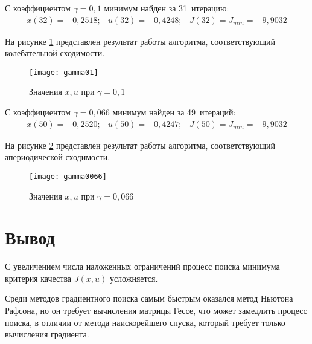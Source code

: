 \documentclass[14pt, a4paper]{extarticle}
\begin{document}
	С коэффициентом $\gamma=0,1$ минимум найден за 31~итерацию:
	$$\begin{matrix}
		x(32)=-0,2518; & u(32)=-0,4248; & J(32)=J_{min}=-9,9032
	\end{matrix}$$
	
	На рисунке \ref{fig:gamma01} представлен результат работы алгоритма, соответствующий колебательной сходимости.
	
	\begin{figure}[H]
		\centering
		\texttt{[image: gamma01]}
		\caption{Значения $x,u$ при $\gamma=0,1$}
		\label{fig:gamma01}
	\end{figure}
	
	С коэффициентом $\gamma=0,066$ минимум найден за 49~итераций:
	$$\begin{matrix}
		x(50)=-0,2520; & u(50)=-0,4247; & J(50)=J_{min}=-9,9032
	\end{matrix}$$

	На рисунке \ref{fig:gamma0066} представлен результат работы алгоритма, соответствующий апериодической сходимости.
	
	\begin{figure}[H]
		\centering
		\texttt{[image: gamma0066]}
		\caption{Значения $x,u$ при $\gamma=0,066$}
		\label{fig:gamma0066}
	\end{figure}

	\newpage
	
	\section*{Вывод}
	
	С увеличением числа наложенных ограничений процесс поиска минимума критерия качества $J(x,u)$ усложняется.
	
	Среди методов градиентного поиска самым быстрым оказался метод Ньютона Рафсона, но он требует вычисления матрицы Гессе, что может замедлить процесс поиска, в отличии от метода наискорейшего спуска, который требует только вычисления градиента.
	
\end{document}

